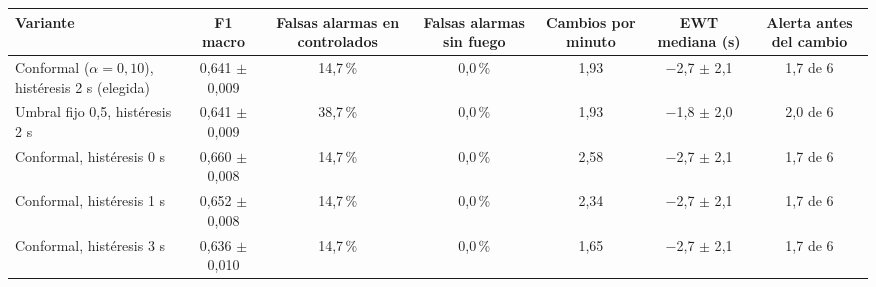 \begin{tabular}{|l|c|c|c|c|c|c|}
\hline
\textbf{Variante} & \textbf{F1 macro} & \textbf{Falsas alarmas en controlados} & \textbf{Falsas alarmas sin fuego} & \textbf{Cambios por minuto} & \textbf{EWT mediana (s)} & \textbf{Alerta antes del cambio} \\ \hline
Conformal ($\alpha = 0{,}10$), histéresis 2 s (elegida) & 0{,}641 $\pm$ 0{,}009 & 14{,}7\,\% & 0{,}0\,\% & 1{,}93 & $-$2{,}7 $\pm$ 2{,}1 & 1{,}7 de 6 \\ \hline
Umbral fijo 0{,}5, histéresis 2 s & 0{,}641 $\pm$ 0{,}009 & 38{,}7\,\% & 0{,}0\,\% & 1{,}93 & $-$1{,}8 $\pm$ 2{,}0 & 2{,}0 de 6 \\ \hline
Conformal, histéresis 0 s & 0{,}660 $\pm$ 0{,}008 & 14{,}7\,\% & 0{,}0\,\% & 2{,}58 & $-$2{,}7 $\pm$ 2{,}1 & 1{,}7 de 6 \\ \hline
Conformal, histéresis 1 s & 0{,}652 $\pm$ 0{,}008 & 14{,}7\,\% & 0{,}0\,\% & 2{,}34 & $-$2{,}7 $\pm$ 2{,}1 & 1{,}7 de 6 \\ \hline
Conformal, histéresis 3 s & 0{,}636 $\pm$ 0{,}010 & 14{,}7\,\% & 0{,}0\,\% & 1{,}65 & $-$2{,}7 $\pm$ 2{,}1 & 1{,}7 de 6 \\ \hline
\end{tabular}
